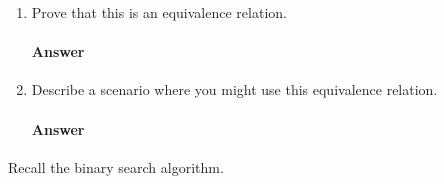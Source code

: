 \documentclass{article}
\begin{document}
\begin{enumerate}

    \item Prove that this is an equivalence relation.

        \paragraph{Answer}


    \item Describe a scenario where you might use this equivalence relation.

        \paragraph{Answer}


\end{enumerate}

\collab{\todo{}} 

Recall the binary search algorithm.
\end{document}

